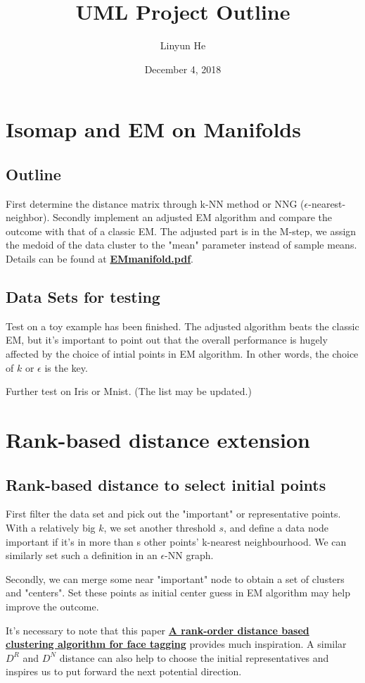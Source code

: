 \documentclass[letterpaper]{article}
\title{UML Project Outline}
\author{Linyun He}
\date{December 4, 2018}
\begin{document}
\maketitle

\section{Isomap and EM on Manifolds}
\subsection*{Outline}
First determine the distance matrix through k-NN method or NNG ($\epsilon$-nearest-neighbor). Secondly implement an adjusted EM algorithm and compare the outcome with that of a classic EM. The adjusted part is in the M-step, we assign the medoid of the data cluster to the "mean" parameter instead of sample means. Details can be found at 
\href{https://github.com/Geophagus96/Manifold-EM/blob/master/doc/EMmanifold.pdf}{\textbf{EMmanifold.pdf}}\cite{adEM}.

\subsection*{Data Sets for testing}
Test on a toy example has been finished. The adjusted algorithm beats the classic EM, but it's important to point out that the overall performance is hugely affected by the choice of intial points in EM algorithm. In other words, the choice of $k$ or $\epsilon$ is the key. \par
Further test on Iris or Mnist. (The list may be updated.)

\section{Rank-based distance extension}
\subsection{Rank-based distance to select initial points}
First filter the data set and pick out the "important" or representative points. With a relatively big $k$, we set another threshold $s$, and define a data node important if it's in more than s other points' k-nearest neighbourhood. We can similarly set such a definition in an $\epsilon$-NN graph.\par
Secondly, we can merge some near "important" node to obtain a set of clusters and "centers". Set these points as initial center guess in EM algorithm may help improve the outcome. \par
It's necessary to note that this paper \href{https://ieeexplore.ieee.org/document/5995680/figures#figures}{\textbf{A rank-order distance based clustering algorithm for face tagging}}\cite{rankdface} provides much inspiration. A similar $D^R$ and $D^N$ distance can also help to choose the initial representatives and inspires us to put forward the next potential direction.
\end{document}
